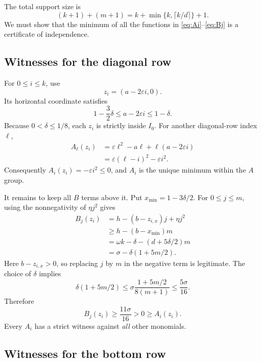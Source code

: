 \documentclass[11pt,a4paper]{article}
\numberwithin{equation}{section}
\theoremstyle{definition}
\theoremstyle{remark}
\begin{document}
The total support size is
\begin{equation}
\label{eq:size}
(k+1)+(m+1)=k+\min\{k,\lceil k/d\rceil\}+1.
\end{equation}
We must show that the minimum of all the functions in
\eqref{eq:Ai}--\eqref{eq:Bj} is a certificate of independence.

\subsection{Witnesses for the diagonal row}

For $0\leq i\leq k$, use
\begin{equation}
\label{eq:Awit}
z_i=(a-2\varepsilon i,0).
\end{equation}
Its horizontal coordinate satisfies
\[
1-\frac32\delta\leq a-2\varepsilon i\leq1-\delta.
\]
Because $0<\delta\leq1/8$, each $z_i$ is strictly inside $I_0$.
For another diagonal-row index $\ell$,
\begin{align}
A_\ell(z_i)
&=\varepsilon\ell^2-a\ell+\ell(a-2\varepsilon i)\nonumber\\
&=\varepsilon(\ell-i)^2-\varepsilon i^2.\label{eq:Asquare}
\end{align}
Consequently $A_i(z_i)=-\varepsilon i^2\leq0$, and $A_i$ is the unique
minimum within the $A$ group.

It remains to keep all $B$ terms above it. Put
$x_{\min}=1-3\delta/2$. For $0\leq j\leq m$, using the nonnegativity of
$\eta j^2$ gives
\begin{align}
B_j(z_i)
&=h-(b-z_{i,x})j+\eta j^2\nonumber\\
&\geq h-(b-x_{\min})m\nonumber\\
&=\omega k-\delta-(d+5\delta/2)m\nonumber\\
&=\sigma-\delta(1+5m/2).\label{eq:Bpositive}
\end{align}
Here $b-z_{i,x}>0$, so replacing $j$ by $m$ in the negative term is legitimate.
The choice of $\delta$ implies
\[
\delta(1+5m/2)
\leq \sigma\frac{1+5m/2}{8(m+1)}
\leq\frac{5\sigma}{16}.
\]
Therefore
\begin{equation}
\label{eq:Bmargin}
B_j(z_i)\geq\frac{11\sigma}{16}>0\geq A_i(z_i).
\end{equation}
Every $A_i$ has a strict witness against \emph{all} other monomials.

\subsection{Witnesses for the bottom row}
\end{document}
